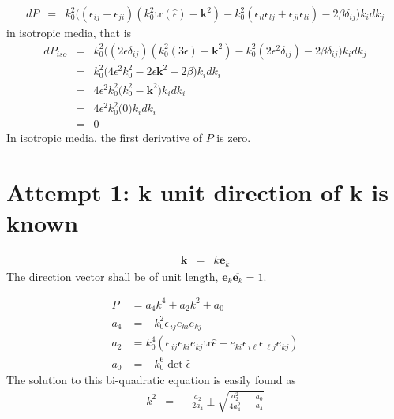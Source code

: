 \documentclass[12pt,a4paper,twoside,openright,BCOR10mm,headsepline,titlepage,abstracton,chapterprefix,final]{scrreprt}
\newcommand\Vector[1]{{\mathbf{#1}}}
\newcommand\wavenumber{k}
\newcommand\Wavevector{\Vector{\wavenumber}}
\newcommand\Tensor[1]{\hat{#1}}
\newcommand\scalarrelativepermittivity{\epsilon}
\newcommand\relativepermittivity{\Tensor{\scalarrelativepermittivity}}
\begin{document}
\begin{eqnarray}
 dP &=& \wavenumber_0^2 
    \bigg( 
       (\scalarrelativepermittivity_{ij} + \scalarrelativepermittivity_{ji}) ( \wavenumber_0^2 \text{tr}(\relativepermittivity) 
     - \Wavevector^2 ) - \wavenumber_0^2 (\scalarrelativepermittivity_{il}\scalarrelativepermittivity_{lj} + \scalarrelativepermittivity_{jl}\scalarrelativepermittivity_{li}) 
     - 2 \beta \delta_{ij}
   \bigg)
   \wavenumber_i d\wavenumber_j 
\end{eqnarray}
in isotropic media, that is
\begin{eqnarray}
 dP_{iso} &=& \wavenumber_0^2 
    \bigg( 
       ( 2 \scalarrelativepermittivity \delta_{ij}) ( \wavenumber_0^2 (3 \scalarrelativepermittivity) 
     - \Wavevector^2 ) - \wavenumber_0^2 ( 2 \scalarrelativepermittivity^2 \delta_{ij})
     - 2 \beta \delta_{ij}
   \bigg)
   \wavenumber_i d\wavenumber_j 
 \\
 &=& \wavenumber_0^2 
    \bigg( 
       4 \scalarrelativepermittivity^2 \wavenumber_0^2 
     - 2 \scalarrelativepermittivity \Wavevector^2
     - 2 \beta
   \bigg)
   \wavenumber_i d\wavenumber_i
 \\
 &=& 4 \scalarrelativepermittivity^2 \wavenumber_0^2 
    \bigg( 
       \wavenumber_0^2 - \Wavevector^2
   \bigg)
   \wavenumber_i d\wavenumber_i
 \\
 &=& 4 \scalarrelativepermittivity^2 \wavenumber_0^2 
    \bigg( 0 \bigg)
   \wavenumber_i d\wavenumber_i
 \\
 &=& 0
\end{eqnarray}
In isotropic media, the first derivative of $P$ is zero.


\section{Attempt 1: k unit direction of k is known}

\begin{eqnarray}
 \Wavevector &=& \wavenumber \Vector{e}_\wavenumber
\end{eqnarray}
The direction vector shall be of unit length, $\Vector{e}_\wavenumber \overline{\Vector{e}_\wavenumber} = 1$.

\begin{align}
 P &= a_4 \wavenumber^4 + a_2 \wavenumber^2 + a_0
 \\
 a_4 &= - k_0^2 \scalarrelativepermittivity_{\,ij} e_{ki} e_{kj}
 \\
 a_2 &=   k_0^4 ( \scalarrelativepermittivity_{\,ij} e_{ki} e_{kj} \text{tr}\relativepermittivity - e_{ki} \scalarrelativepermittivity_{\,i\ell} \scalarrelativepermittivity_{\,\ell j} e_{kj})
 \\
 a_0 &= - k_0^6 \det \relativepermittivity
\end{align}
The solution to this bi-quadratic equation is easily found as
\begin{eqnarray}
 \wavenumber^2 &=& - \frac{a_2}{2 a_4} \pm \sqrt{\frac{a_2^2}{4 a_4^2} - \frac{a_0}{a_4}} 
\end{eqnarray}
\end{document}
